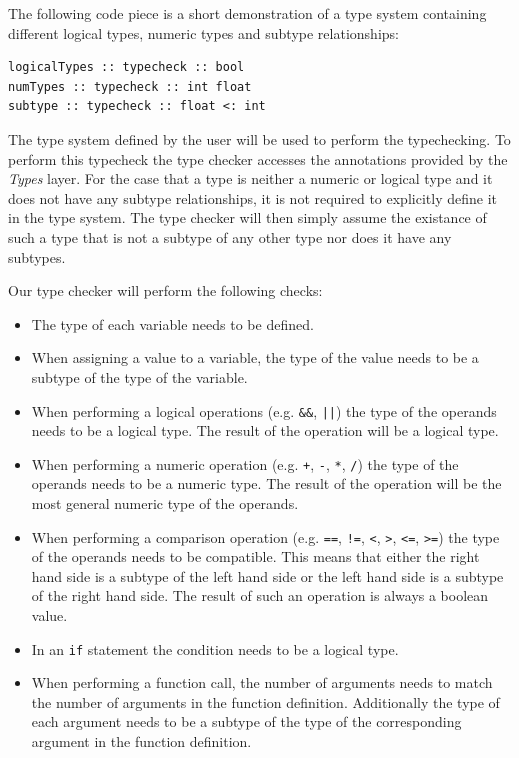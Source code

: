 \documentclass[acmsmall, review, screen]{acmart}
\begin{document}
The following code piece is a short demonstration of a type system containing different logical types, numeric types and subtype relationships:

\begin{lstlisting}
logicalTypes :: typecheck :: bool
numTypes :: typecheck :: int float
subtype :: typecheck :: float <: int
\end{lstlisting}

The type system defined by the user will be used to perform the typechecking. To perform this typecheck the type checker accesses the annotations provided by the \textit{Types} layer. For the case that a type is neither a numeric or logical type and it does not have any subtype relationships, it is not required to explicitly define it in the type system. The type checker will then simply assume the existance of such a type that is not a subtype of any other type nor does it have any subtypes.

Our type checker will perform the following checks:

\begin{itemize}
	\item The type of each variable needs to be defined.
	\item When assigning a value to a variable, the type of the value needs to be a subtype of the type of the variable.
	\item When performing a logical operations (e.g. \texttt{\&\&}, \texttt{||}) the type of the operands needs to be a logical type. The result of the operation will be a logical type.
	\item When performing a numeric operation (e.g. \texttt{+}, \texttt{-}, \texttt{*}, \texttt{/}) the type of the operands needs to be a numeric type. The result of the operation will be the most general numeric type of the operands.
	\item When performing a comparison operation (e.g. \texttt{==}, \texttt{!=}, \texttt{<}, \texttt{>}, \texttt{<=}, \texttt{>=}) the type of the operands needs to be compatible. This means that either the right hand side is a subtype of the left hand side or the left hand side is a subtype of the right hand side. The result of such an operation is always a boolean value.
	\item In an \texttt{if} statement the condition needs to be a logical type.
	\item When performing a function call, the number of arguments needs to match the number of arguments in the function definition. Additionally the type of each argument needs to be a subtype of the type of the corresponding argument in the function definition.
\end{itemize}
\end{document}
